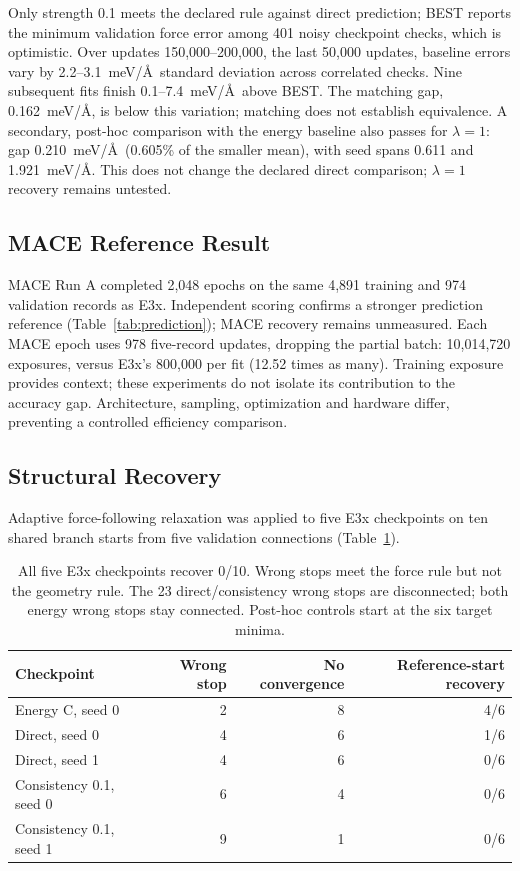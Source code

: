 \documentclass{article}
\begin{document}
Only strength 0.1 meets the declared rule against direct prediction; BEST reports the minimum validation force error among 401 noisy checkpoint checks, which is optimistic. Over updates 150,000--200,000, the last 50,000 updates, baseline errors vary by 2.2--3.1~meV/\AA\ standard deviation across correlated checks. Nine subsequent fits finish 0.1--7.4~meV/\AA\ above BEST. The matching gap, 0.162~meV/\AA, is below this variation; matching does not establish equivalence. A secondary, post-hoc comparison with the energy baseline also passes for $\lambda=1$: gap 0.210~meV/\AA\ (0.605\% of the smaller mean), with seed spans 0.611 and 1.921~meV/\AA. This does not change the declared direct comparison; $\lambda=1$ recovery remains untested.

\subsection{MACE Reference Result}
MACE Run A completed 2,048 epochs on the same 4,891 training and 974 validation records as E3x. Independent scoring confirms a stronger prediction reference (Table~\ref{tab:prediction}); MACE recovery remains unmeasured. Each MACE epoch uses 978 five-record updates, dropping the partial batch: 10,014,720 exposures, versus E3x's 800,000 per fit (12.52 times as many). Training exposure provides context; these experiments do not isolate its contribution to the accuracy gap. Architecture, sampling, optimization and hardware differ, preventing a controlled efficiency comparison.

\subsection{Structural Recovery}
Adaptive force-following relaxation was applied to five E3x checkpoints on ten shared branch starts from five validation connections (Table~\ref{tab:recovery}).

\begin{table}[H]
\centering\small
\caption{All five E3x checkpoints recover 0/10. Wrong stops meet the force rule but not the geometry rule. The 23 direct/consistency wrong stops are disconnected; both energy wrong stops stay connected. Post-hoc controls start at the six target minima.}\label{tab:recovery}
\begin{tabular}{lrrr}\toprule
Checkpoint & Wrong stop & No convergence & Reference-start recovery\\\midrule
Energy C, seed 0 & 2 & 8 & 4/6\\
Direct, seed 0 & 4 & 6 & 1/6\\
Direct, seed 1 & 4 & 6 & 0/6\\
Consistency 0.1, seed 0 & 6 & 4 & 0/6\\
Consistency 0.1, seed 1 & 9 & 1 & 0/6\\\bottomrule
\end{tabular}
\end{table}
\end{document}
